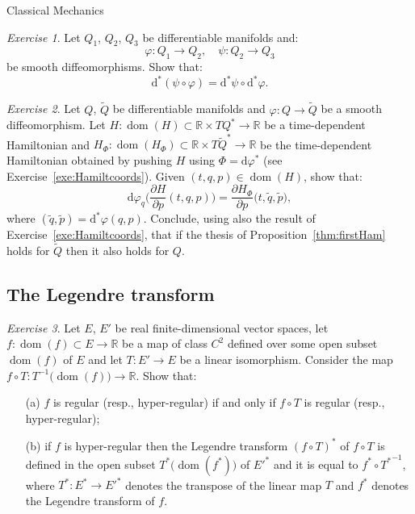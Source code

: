 \documentclass[oneside,a4paper,11pt]{amsbook}
\newcommand{\R}{\mathds R}
\newcommand{\dd}{\mathrm d}
\DeclareMathOperator{\Dom}{dom}
\theoremstyle{remark}\newtheorem{exercise}{Exercise}[chapter]
\theoremstyle{plain}\newtheorem{teo}{Theorem}[section]
\theoremstyle{plain}\newtheorem{lem}[teo]{Lemma}
\theoremstyle{plain}\newtheorem{prop}[teo]{Proposition}
\theoremstyle{plain}\newtheorem{cor}[teo]{Corollary}
\theoremstyle{definition}\newtheorem{defin}[teo]{Definition}
\theoremstyle{remark}\newtheorem{rem}[teo]{Remark}
\theoremstyle{definition}\newtheorem{notation}[teo]{Notation}
\theoremstyle{definition}\newtheorem{convention}[teo]{Convention}
\theoremstyle{definition}\newtheorem{example}[teo]{Example}
\numberwithin{section}{chapter}
\numberwithin{equation}{section}
\begin{document}
\begin{chapter}{Classical Mechanics}
\begin{exercise}\label{exe:dstarfunc}
Let $Q_1$, $Q_2$, $Q_3$ be differentiable manifolds and:
\[\varphi:Q_1\longrightarrow Q_2,\quad\psi:Q_2\longrightarrow Q_3\]
be smooth diffeomorphisms. Show that:
\[\dd^*(\psi\circ\varphi)=\dd^*\psi\circ\dd^*\varphi.\]
\end{exercise}

\begin{exercise}\label{exe:firstHam}
Let $Q$, $\widetilde Q$ be differentiable manifolds and $\varphi:Q\to\widetilde Q$ be a smooth diffeomorphism.
Let $H:\Dom(H)\subset\R\times TQ^*\to\R$ be a time-dependent Hamiltonian and $H_\Phi:\Dom(H_\Phi)\subset\R\times T\widetilde Q^*\to\R$ be the
time-dependent Hamiltonian obtained by pushing $H$ using $\Phi=\dd\varphi^*$ (see Exercise~\ref{exe:Hamiltcoords}).
Given $(t,q,p)\in\Dom(H)$, show that:
\[\dd\varphi_q\Big(\frac{\partial H}{\partial p}(t,q,p)\Big)=\frac{\partial H_\Phi}{\partial p}\big(t,\tilde q,\tilde p),\]
where $(\tilde q,\tilde p)=\dd^*\varphi(q,p)$. Conclude, using also the result of Exercise~\ref{exe:Hamiltcoords}, that if the thesis
of Proposition~\ref{thm:firstHam} holds for $\widetilde Q$ then it also holds for $Q$.
\end{exercise}

\subsection*{The Legendre transform}

\begin{exercise}\label{exe:Legtransiso}
Let $E$, $E'$ be real finite-dimensional vector spaces, let $f:\Dom(f)\subset E\to\R$ be a map of class $C^2$ defined over some open subset $\Dom(f)$ of $E$
and let $T:E'\to E$ be a linear isomorphism. Consider the map $f\circ T:T^{-1}\big(\!\Dom(f)\big)\to\R$. Show that:
\begin{itemize}
\item[(a)] $f$ is regular (resp., hyper-regular) if and only if $f\circ T$ is regular (resp., hyper-regular);
\item[(b)] if $f$ is hyper-regular then the Legendre transform $(f\circ T)^*$ of $f\circ T$ is defined in the open subset $T^*\big(\!\Dom(f^*)\big)$
of ${E'}^*$ and it is equal to $f^*\circ{T^*}^{-1}$, where $T^*:E^*\to{E'}^*$ denotes the transpose
of the linear map $T$ and $f^*$ denotes the Legendre transform of $f$.
\end{itemize}
\end{exercise}


\end{chapter}
\end{document}
